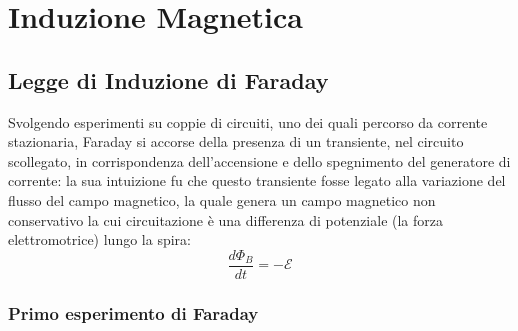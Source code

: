 \documentclass[]{article}
\begin{document}
\section{Induzione Magnetica}

\subsection{Legge di Induzione di Faraday}

Svolgendo esperimenti su coppie di circuiti, uno dei quali percorso da corrente stazionaria, Faraday si accorse della presenza di un transiente, nel circuito scollegato, in corrispondenza dell'accensione e dello spegnimento del generatore di corrente: la sua intuizione fu che questo transiente fosse legato alla variazione del flusso del campo magnetico, la quale genera un campo magnetico non conservativo la cui circuitazione è una differenza di potenziale (la forza elettromotrice) lungo la spira:
\begin{equation}
	\frac{d\Phi_B}{dt} = -\mathcal{E}
	\label{eq:1}
\end{equation}

\subsubsection{Primo esperimento di Faraday}
\end{document}
